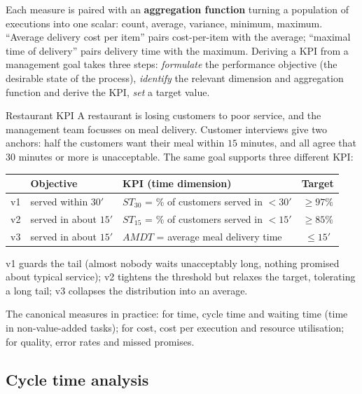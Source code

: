 Each measure is paired with an \textbf{aggregation function} turning a population of executions into one scalar: count, average, variance, minimum, maximum. ``Average delivery cost per item'' pairs cost-per-item with the average; ``maximal time of delivery'' pairs delivery time with the maximum. Deriving a KPI from a management goal takes three steps: \emph{formulate} the performance objective (the desirable state of the process), \emph{identify} the relevant dimension and aggregation function and derive the KPI, \emph{set} a target value.
\begin{examplebox}{Restaurant KPI}
A restaurant is losing customers to poor service, and the management team focusses on meal delivery. Customer interviews give two anchors: half the customers want their meal within $15$ minutes, and all agree that $30$ minutes or more is unacceptable. The same goal supports three different KPI:
\begin{center}
\begin{tabular}{lllc}
\toprule
 & \textbf{Objective} & \textbf{KPI (time dimension)} & \textbf{Target}\\
\midrule
v1 & served within $30'$ & $ST_{30}$ = \% of customers served in $<30'$ & $\geq 97\%$\\
v2 & served in about $15'$ & $ST_{15}$ = \% of customers served in $<15'$ & $\geq 85\%$\\
v3 & served in about $15'$ & $AMDT$ = average meal delivery time & $\leq 15'$\\
\bottomrule
\end{tabular}
\end{center}
v1 guards the tail (almost nobody waits unacceptably long, nothing promised about typical service); v2 tightens the threshold but relaxes the target, tolerating a long tail; v3 collapses the distribution into an average.
\end{examplebox}
The canonical measures in practice: for time, cycle time and waiting time (time in non-value-added tasks); for cost, cost per execution and resource utilisation; for quality, error rates and missed promises.

\subsection{Cycle time analysis}

